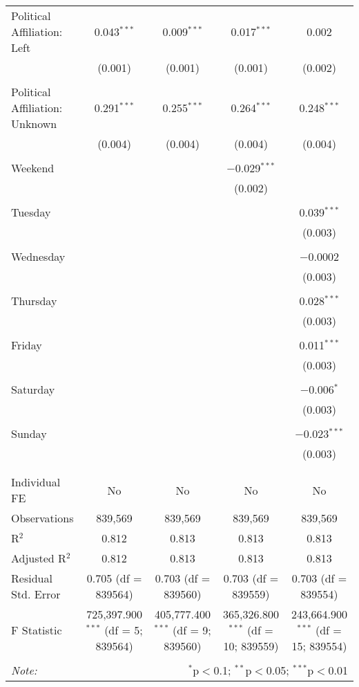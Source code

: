 \documentclass[
]{article}
\begin{document}
\begin{table}[!htbp]
{\begin{tabular}{@{\extracolsep{5pt}}lcccc}
 Political Affiliation: Left & 0.043$^{***}$ & 0.009$^{***}$ & 0.017$^{***}$ & 0.002 \\ 
  & (0.001) & (0.001) & (0.001) & (0.002) \\ 
  & & & & \\ 
 Political Affiliation: Unknown & 0.291$^{***}$ & 0.255$^{***}$ & 0.264$^{***}$ & 0.248$^{***}$ \\ 
  & (0.004) & (0.004) & (0.004) & (0.004) \\ 
  & & & & \\ 
 Weekend &  &  & $-$0.029$^{***}$ &  \\ 
  &  &  & (0.002) &  \\ 
  & & & & \\ 
 Tuesday &  &  &  & 0.039$^{***}$ \\ 
  &  &  &  & (0.003) \\ 
  & & & & \\ 
 Wednesday &  &  &  & $-$0.0002 \\ 
  &  &  &  & (0.003) \\ 
  & & & & \\ 
 Thursday &  &  &  & 0.028$^{***}$ \\ 
  &  &  &  & (0.003) \\ 
  & & & & \\ 
 Friday &  &  &  & 0.011$^{***}$ \\ 
  &  &  &  & (0.003) \\ 
  & & & & \\ 
 Saturday &  &  &  & $-$0.006$^{*}$ \\ 
  &  &  &  & (0.003) \\ 
  & & & & \\ 
 Sunday &  &  &  & $-$0.023$^{***}$ \\ 
  &  &  &  & (0.003) \\ 
  & & & & \\ 
\hline \\[-1.8ex] 
Individual FE & No & No & No & No \\ 
Observations & 839,569 & 839,569 & 839,569 & 839,569 \\ 
R$^{2}$ & 0.812 & 0.813 & 0.813 & 0.813 \\ 
Adjusted R$^{2}$ & 0.812 & 0.813 & 0.813 & 0.813 \\ 
Residual Std. Error & 0.705 (df = 839564) & 0.703 (df = 839560) & 0.703 (df = 839559) & 0.703 (df = 839554) \\ 
F Statistic & 725,397.900$^{***}$ (df = 5; 839564) & 405,777.400$^{***}$ (df = 9; 839560) & 365,326.800$^{***}$ (df = 10; 839559) & 243,664.900$^{***}$ (df = 15; 839554) \\ 
\hline 
\hline \\[-1.8ex] 
\textit{Note:}  & \multicolumn{4}{r}{$^{*}$p$<$0.1; $^{**}$p$<$0.05; $^{***}$p$<$0.01} \\ 
\end{tabular}
} 
\end{table} 
\newpage
\end{document}
